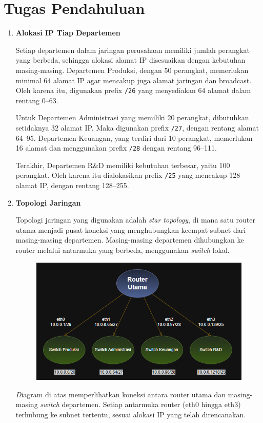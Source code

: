 \section*{Tugas Pendahuluan}
\begin{enumerate}
    \item \textbf{Alokasi IP Tiap Departemen}

    Setiap departemen dalam jaringan perusahaan memiliki jumlah perangkat yang berbeda, sehingga alokasi alamat IP disesuaikan dengan kebutuhan masing-masing. Departemen Produksi, dengan 50 perangkat, memerlukan minimal 64 alamat IP agar mencakup juga alamat jaringan dan broadcast. Oleh karena itu, digunakan prefix \texttt{/26} yang menyediakan 64 alamat dalam rentang 0--63.

    Untuk Departemen Administrasi yang memiliki 20 perangkat, dibutuhkan setidaknya 32 alamat IP. Maka digunakan prefix \texttt{/27}, dengan rentang alamat 64--95. Departemen Keuangan, yang terdiri dari 10 perangkat, memerlukan 16 alamat dan menggunakan prefix \texttt{/28} dengan rentang 96--111.

    Terakhir, Departemen R\&D memiliki kebutuhan terbesar, yaitu 100 perangkat. Oleh karena itu dialokasikan prefix \texttt{/25} yang mencakup 128 alamat IP, dengan rentang 128--255.

    \item \textbf{Topologi Jaringan}

    Topologi jaringan yang digunakan adalah \textit{star topology}, di mana satu router utama menjadi pusat koneksi yang menghubungkan keempat subnet dari masing-masing departemen. Masing-masing departemen dihubungkan ke router melalui antarmuka yang berbeda, menggunakan \textit{switch} lokal.

    \begin{figure}[h]
        \centering
        \includegraphics[width=0.5\linewidth]{Screenshot 2025-05-09 135115.png}
        \label{fig:enter-label}
    \end{figure}

    \textit Diagram di atas memperlihatkan koneksi antara router utama dan masing-masing \textit{switch} departemen. Setiap antarmuka router (eth0 hingga eth3) terhubung ke subnet tertentu, sesuai alokasi IP yang telah direncanakan.


\end{enumerate}
